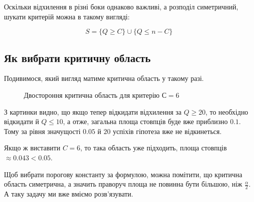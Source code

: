 \documentclass[
  letterpaper,
  10pt,
  openany]{report}
\theoremstyle{definition}
\theoremstyle{remark}
\begin{document}
Оскільки відхилення в різні боки однаково важливі, а розподіл
симетричний, шукати критерій можна в такому вигляді:

\[
S = \{Q \geqslant C\} \cup \{Q \leqslant n - C\}
\]

\subsection{Як вибрати критичну
область}\label{ux44fux43a-ux432ux438ux431ux440ux430ux442ux438-ux43aux440ux438ux442ux438ux447ux43dux443-ux43eux431ux43bux430ux441ux442ux44c}

Подивимося, який вигляд матиме критична область у такому разі.

\begin{figure}[H]


\caption{\label{fig-binom-pmf-two-sided}Двостороння критична область для
критерію \(С = 6\)}

\end{figure}%

З картинки видно, що якщо тепер відкидати відхилення за
\(Q \geqslant 20\), то необхідно відкидати й \(Q \leqslant 10\), а отже,
загальна площа стовпців буде вже приблизно \(0.1\). Тому за рівня
значущості \(0.05\) й \(20\) успіхів гіпотеза вже не відкинеться.

Якщо ж виставити \(C = 6\), то така область уже підходить, площа
стовпців \(\approx 0.043 < 0.05\).

Щоб вибрати порогову константу за формулою, можна помітити, що критична
область симетрична, а значить праворуч площа не повинна бути більшою,
ніж \(\frac{\alpha}{2}\). А таку задачу ми вже вміємо розв'язувати.
\end{document}
